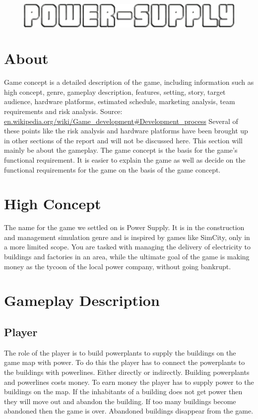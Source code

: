     \begin{figure}[H]
    	\includegraphics[scale=0.40]{pictures/logo2.png}
    \end{figure}

\section{About}
    Game concept is a detailed description of the game, including information such as high concept, genre,
    gameplay description, features, setting, story, target audience, hardware platforms, estimated schedule,
    marketing analysis, team requirements and risk analysis. Source: 
    \url{en.wikipedia.org/wiki/Game_development#Development_process}
    Several of these points like the risk analysis and hardware platforms have been brought up in other 
    sections of the report and will not be discussed here. This section will mainly be about the gameplay. 
    The game concept is the basis for the game's functional requirement. It is easier to explain the game 
    as well as decide on the functional requirements for the game on the basis of the game concept. 


\section{High Concept}
    The name for the game we settled on is Power Supply. It is in the construction and management 
    simulation genre and is inspired by games like SimCity, only in a more limited scope. You are 
    tasked with managing the delivery of electricity to buildings and factories in an area, while the 
    ultimate goal of the game is making money as the tycoon of the local power company, without going 
    bankrupt.

\section{Gameplay Description}

\subsection*{Player}
    The role of the player is to build powerplants to supply the buildings on the game map with power. 
    To do this the player has to connect the powerplants to the buildings with powerlines. Either directly
    or indirectly. Building powerplants and powerlines costs money. To earn money the player has to supply
    power to the buildings on the map. If the inhabitants of a building does not get power then they will
    move out and abandon the building. If too many buildings become abandoned then the game is over.
    Abandoned buildings disappear from the game.

